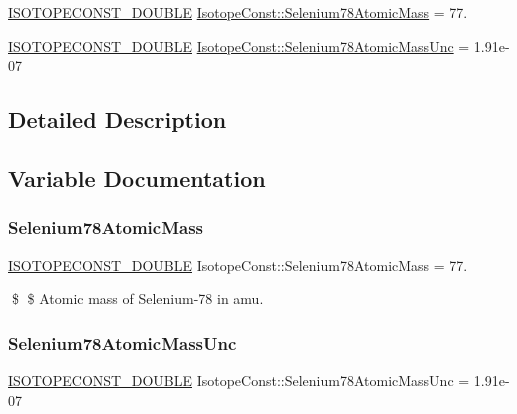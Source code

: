 \begin{DoxyCompactItemize}
\item 
\mbox{\hyperlink{group___isotope_const-_macros_ga8f45a7272ce02c0b4c65c44636ed719a}{I\+S\+O\+T\+O\+P\+E\+C\+O\+N\+S\+T\+\_\+\+D\+O\+U\+B\+LE}} \mbox{\hyperlink{group___isotope_const-_selenium-_se78_ga0444944e1075ea53a7d60689f8db22ea}{Isotope\+Const\+::\+Selenium78\+Atomic\+Mass}} = 77.
\item 
\mbox{\hyperlink{group___isotope_const-_macros_ga8f45a7272ce02c0b4c65c44636ed719a}{I\+S\+O\+T\+O\+P\+E\+C\+O\+N\+S\+T\+\_\+\+D\+O\+U\+B\+LE}} \mbox{\hyperlink{group___isotope_const-_selenium-_se78_ga7475bbaee4882b8dc282eeaedd662de9}{Isotope\+Const\+::\+Selenium78\+Atomic\+Mass\+Unc}} = 1.\+91e-\/07
\end{DoxyCompactItemize}


\subsection{Detailed Description}


\subsection{Variable Documentation}
\mbox{\label{group___isotope_const-_selenium-_se78_ga0444944e1075ea53a7d60689f8db22ea}} 
\subsubsection{\texorpdfstring{Selenium78\+Atomic\+Mass}{Selenium78AtomicMass}}
{\footnotesize\ttfamily \mbox{\hyperlink{group___isotope_const-_macros_ga8f45a7272ce02c0b4c65c44636ed719a}{I\+S\+O\+T\+O\+P\+E\+C\+O\+N\+S\+T\+\_\+\+D\+O\+U\+B\+LE}} Isotope\+Const\+::\+Selenium78\+Atomic\+Mass = 77.}

\$ \$ Atomic mass of Selenium-\/78 in amu. \mbox{\label{group___isotope_const-_selenium-_se78_ga7475bbaee4882b8dc282eeaedd662de9}} 
\subsubsection{\texorpdfstring{Selenium78\+Atomic\+Mass\+Unc}{Selenium78AtomicMassUnc}}
{\footnotesize\ttfamily \mbox{\hyperlink{group___isotope_const-_macros_ga8f45a7272ce02c0b4c65c44636ed719a}{I\+S\+O\+T\+O\+P\+E\+C\+O\+N\+S\+T\+\_\+\+D\+O\+U\+B\+LE}} Isotope\+Const\+::\+Selenium78\+Atomic\+Mass\+Unc = 1.\+91e-\/07}

